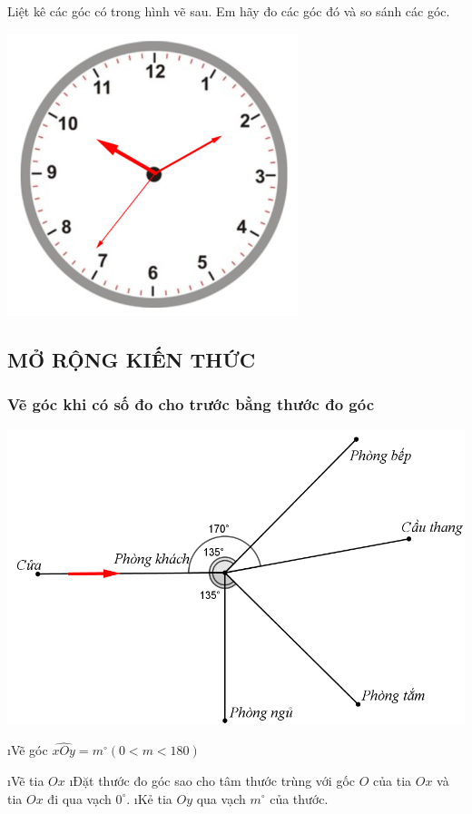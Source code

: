 \begin{vd}
	Liệt kê các góc có trong hình vẽ sau. Em hãy đo các góc đó và so sánh các góc.
	\begin{center}
		\includegraphics[width= 0.5\linewidth]{vd-30-8}
	\end{center}
\end{vd}
\subsection{MỞ RỘNG KIẾN THỨC}
\subsubsection{Vẽ góc khi có số đo cho trước bằng thước đo góc}
\includegraphics[width= 0.5\linewidth]{vd-30-9}
\begin{enumerate}[+,leftmargin=*]
	\i Vẽ góc $\widehat{xOy}={{m}^\circ}\left( 0<m<180 \right)$
	\begin{enumerate}[--,leftmargin=*]
		\i Vẽ tia $Ox$
		\i Đặt thước đo góc sao cho tâm thước trùng với gốc $O$ của tia $Ox$ và tia $Ox$ đi qua vạch ${{0}^\circ}$.
		\i Kẻ tia $Oy$ qua vạch ${{m}^\circ}$ của thước.
	\end{enumerate}
\end{enumerate}
